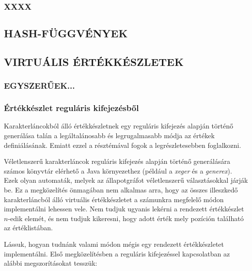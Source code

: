 \documentclass[
    parspace,
    noindent,
    nohyp,
]{elteiktdk}[2023/04/10]
\begin{document}
\subsubsection{XXXX}



\subsection{HASH-FÜGGVÉNYEK}


\subsection{VIRTUÁLIS ÉRTÉKKÉSZLETEK}

\subsubsection{EGYSZERŰEK...}


\subsubsection{Értékkészlet reguláris kifejezésből}

Karakterláncokból álló értékkészletnek egy reguláris kifejezés alapján történő generálása
talán a legáltalánosabb és legrugalmasabb módja az értékek definiálásának.
Emiatt ezzel a résztémával fogok a legrészletesebben foglalkozni.

Véletlenszerű karakterláncok reguláris kifejezés alapján történő generálására
számos könyvtár elérhető a Java környezethez
(például a \textit{xeger} és a \textit{generex}).
Ezek olyan automaták, melyek az állapotgráfot véletlenszerű választásokkal járják be.
Ez a megközelítés önmagában nem alkalmas arra,
hogy az összes illeszkedő karakterláncból álló virtuális értékkészletet
a számunkra megfelelő módon implementálni lehessen vele.
Nem tudjuk ugyanis lekérni a rendezett értékkészlet $n$-edik elemét,
és nem tudjuk kikeresni, hogy adott érték mely pozíción található az értéklistában.

Lássuk, hogyan tudnánk valami módon mégis egy rendezett értékkészletet implementálni.
Első megközelítésben a reguláris kifejezéssel kapcsolatban az alábbi megszorításokat tesszük:
\end{document}
